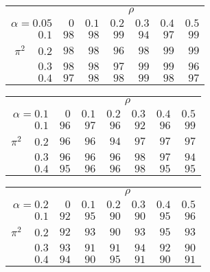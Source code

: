 \begin{tabular}{r|rrrrrr}
\hline\hline
 &\multicolumn{6}{c}{$\rho$} \\ 
 $\alpha = 0.05$ & $0$ & $0.1$ & $0.2$ & $0.3$ & $0.4$ & $0.5$ \\ 
 \hline$0.1$ & $98$ & $98$ & $99$ & $94$ & $97$ & $99$\\ 
$\pi^2\;\;\;$ $0.2$ & $98$ & $98$ & $96$ & $98$ & $99$ & $99$\\ 
$0.3$ & $98$ & $98$ & $97$ & $99$ & $99$ & $96$\\ 
$0.4$ & $97$ & $98$ & $98$ & $99$ & $98$ & $97$\\ 
 \hline 
 \end{tabular}
 
 \vspace{2em} 
 
\begin{tabular}{r|rrrrrr}
\hline\hline
 &\multicolumn{6}{c}{$\rho$} \\ 
 $\alpha = 0.1$ & $0$ & $0.1$ & $0.2$ & $0.3$ & $0.4$ & $0.5$ \\ 
 \hline$0.1$ & $96$ & $97$ & $96$ & $92$ & $96$ & $99$\\ 
$\pi^2\;\;\;$ $0.2$ & $96$ & $96$ & $94$ & $97$ & $97$ & $97$\\ 
$0.3$ & $96$ & $96$ & $96$ & $98$ & $97$ & $94$\\ 
$0.4$ & $95$ & $96$ & $96$ & $98$ & $95$ & $95$\\ 
 \hline 
 \end{tabular}
 
 \vspace{2em} 
 
\begin{tabular}{r|rrrrrr}
\hline\hline
 &\multicolumn{6}{c}{$\rho$} \\ 
 $\alpha = 0.2$ & $0$ & $0.1$ & $0.2$ & $0.3$ & $0.4$ & $0.5$ \\ 
 \hline$0.1$ & $92$ & $95$ & $90$ & $90$ & $95$ & $96$\\ 
$\pi^2\;\;\;$ $0.2$ & $92$ & $93$ & $90$ & $93$ & $95$ & $93$\\ 
$0.3$ & $93$ & $91$ & $91$ & $94$ & $92$ & $90$\\ 
$0.4$ & $94$ & $90$ & $95$ & $91$ & $90$ & $91$\\ 
 \hline 
 \end{tabular}